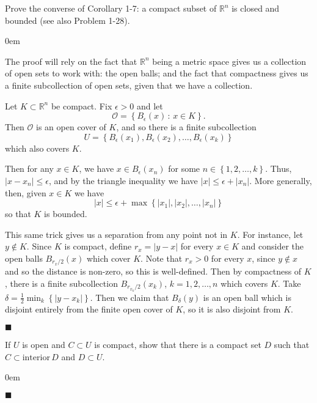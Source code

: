 \documentclass[12pt]{article}
\renewcommand{\qed}{\hfill$\blacksquare$}
\renewenvironment{proof}{\begin{addmargin}[1em]{0em}\begin{newproof}}{\end{newproof}\end{addmargin}\qed}
\newenvironment{problem}[2][Problem]{\begin{trivlist}
\item[\hskip \labelsep {\bfseries #1}\hskip \labelsep {\bfseries #2.}]}{\end{trivlist}}
\begin{document}
 \begin{problem}{1-20}
 Prove the converse of Corollary 1-7: a compact subset of $\mathbb{R}^n$ is closed and bounded (see also Problem 1-28).
 \end{problem}
 \begin{proof}
 The proof will rely on the fact that $\mathbb{R}^n$ being a metric space gives us a collection of open sets to work with: the open balls; and the fact that compactness gives us a finite subcollection of open sets, given that we have a collection.
 
 Let $K\subset \mathbb{R}^n$ be compact. Fix $\epsilon>0$ and let $$\mathcal{O} = \left\{ B_{\epsilon}\left(x\right)\,: \, x\in K \right\}.$$ Then $\mathcal{O}$ is an open cover of $K$, and so there is a finite subcollection $$U = \left\{ B_{\epsilon}\left(x_{1}\right), B_{\epsilon}\left(x_{2}\right), \ldots, B_{\epsilon}\left(x_{k}\right) \right\} $$ which also covers $K$.
 
Then for any $x\in K$, we have $x \in B_{\epsilon}\left(x_n\right)$ for some $n \in \left\{1,2,\ldots,k\right\}$. Thus, $\left|x - x_n\right| \leq \epsilon$, and by the triangle inequality we have $\left|x\right| \leq \epsilon + \left|x_n\right|$. More generally, then, given $x \in K$ we have $$ \left|x\right| \leq \epsilon + \max \left\{ \left|x_1\right|,\left|x_2\right|, \ldots, \left|x_n\right| \right\} $$ so that $K$ is bounded.

This same trick gives us a separation from any point not in $K$. For instance, let $y \notin K$. Since $K$ is compact, define $r_x = \left|y-x\right|$ for every $x \in K$ and consider the open balls $B_{r_x/2}\left(x\right)$ which cover $K$. Note that $r_x > 0$ for every $x$, since $y \notin x$ and so the distance is non-zero, so this is well-defined. Then by compactness of $K$, there is a finite subcollection $B_{r_{x_k}/2}\left(x_k\right)$, $k=1,2,\ldots, n$ which covers $K$. Take $\delta = \frac{1}{2}\min_k \left\{ \left|y - {x_k}\right|\right\} $. Then we claim that $B_{\delta}\left(y\right)$ is an open ball which is disjoint entirely from the finite open cover of $K$, so it is also disjoint from $K$.

 \end{proof}
 
 
 
 
 
 
 
 
 
 
 
 
\begin{problem}{1-22}
If $U$ is open and $C\subset U$ is compact, show that there is a compact set $D$ such that $C \subset \text{interior} \, D$ and $D\subset U$.
\end{problem}
\begin{proof}

\end{proof}
\end{document}
